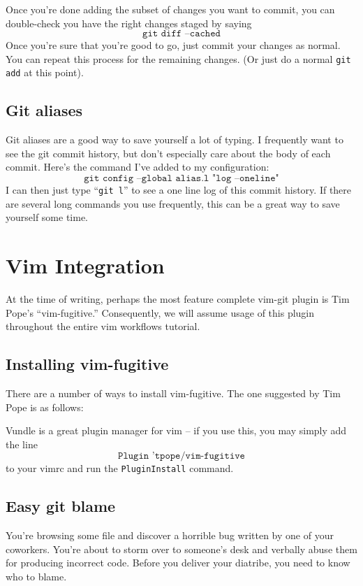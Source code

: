 \documentclass[12pt]{report}
\begin{document}
Once you’re done adding the subset of changes you want to commit, you
can double-check you have the right changes staged by saying
\[
  \texttt{git diff --cached}
\]
Once you’re sure that you’re good to go, just commit your changes as
normal. You can repeat this process for the remaining changes. (Or
just do a normal \texttt{git add} at this point).

\section{Git aliases}
Git aliases are a good way to save yourself a lot of typing. I
frequently want to see the git commit history, but don’t especially
care about the body of each commit. Here’s the command I’ve added to
my configuration:
\[
  \texttt{git config --global alias.l "log --oneline"}
\]
I can then just type “\texttt{git l}” to see a one line log of this
commit history. If there are several long commands you use frequently,
this can be a great way to save yourself some time.

\chapter{Vim Integration}

At the time of writing, perhaps the most feature complete vim-git
plugin is Tim Pope’s “vim-fugitive.” Consequently, we will assume
usage of this plugin throughout the entire vim workflows tutorial.

\section{Installing vim-fugitive}

There are a number of ways to install vim-fugitive. The one suggested
by Tim Pope is as follows:
Vundle is a great plugin manager for vim -- if you use this, you may
simply add the line
\[
  \texttt{Plugin 'tpope/vim-fugitive}
\]
to your vimrc and run the \texttt{PluginInstall} command.

\section{Easy git blame}
You’re browsing some file and discover a horrible bug written by one
of your coworkers. You’re about to storm over to someone’s desk and
verbally abuse them for producing incorrect code. Before you deliver
your diatribe, you need to know who to blame.
\end{document}
